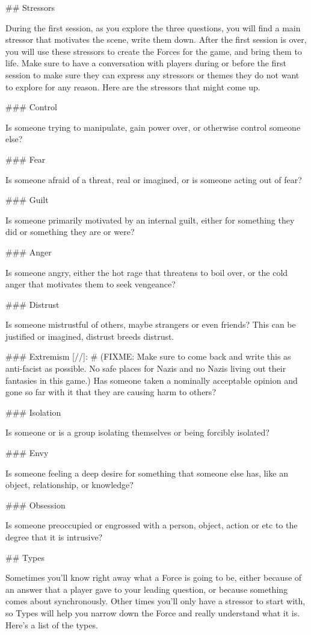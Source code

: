 \documentclass[
  oneside,
  statementpaper,
  9pt]{memoir}
\begin{document}
\begin{MC}
## Stressors

During the first session, as you explore the three questions, you will find a main stressor that motivates the scene, write them down. After the first session is over, you will use these stressors to create the Forces for the game, and bring them to life. Make sure to have a conversation with players during or before the first session to make sure they can express any stressors or themes they do not want to explore for any reason. Here are the stressors that might come up.

### Control

Is someone trying to manipulate, gain power over, or otherwise control someone else?

### Fear

Is someone afraid of a threat, real or imagined, or is someone acting out of fear?

### Guilt

Is someone primarily motivated by an internal guilt, either for something they did or something they are or were?

### Anger

Is someone angry, either the hot rage that threatens to boil over, or the cold anger that motivates them to seek vengeance?

### Distrust

Is someone mistrustful of others, maybe strangers or even friends? This can be justified or imagined, distrust breeds distrust.

### Extremism
[//]: # (FIXME: Make sure to come back and write this as anti-facist as possible. No safe places for Nazis and no Nazis living out their fantasies in this game.)
Has someone taken a nominally acceptable opinion and gone so far with it that they are causing harm to others?

### Isolation

Is someone or is a group isolating themselves or being forcibly isolated?

### Envy

Is someone feeling a deep desire for something that someone else has, like an object, relationship, or knowledge?

### Obsession

Is someone preoccupied or engrossed with a person, object, action or etc to the degree that it is intrusive?

## Types

Sometimes you’ll know right away what a Force is going to be, either because of an answer that a player gave to your leading question, or because something comes about synchronously. Other times you’ll only have a stressor to start with, so Types will help you narrow down the Force and really understand what it is. Here’s a list of the types.


\end{MC}
\end{document}
